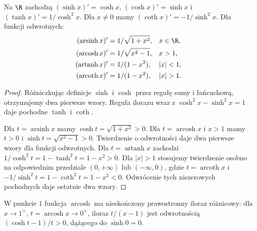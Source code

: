 \begin{twierdzenie}
\label{ma1:thm:hyperbolic-derivatives}
Na $\R$ zachodzą $(\sinh x)'=\cosh x$, $(\cosh x)'=\sinh x$ i $(\tanh x)'=1/\cosh^2x$. Dla $x\ne0$ mamy $(\coth x)'=-1/\sinh^2x$. Dla funkcji odwrotnych:
\begin{align*}
 (\operatorname{arsinh}x)'&=1/\sqrt{1+x^2},&&x\in\R,\\
 (\operatorname{arcosh}x)'&=1/\sqrt{x^2-1},&&x>1,\\
 (\operatorname{artanh}x)'&=1/(1-x^2),&&|x|<1,\\
 (\operatorname{arcoth}x)'&=1/(1-x^2),&&|x|>1.
\end{align*}
\end{twierdzenie}
\begin{proof}
Różniczkując definicje $\sinh$ i $\cosh$ przez regułę sumy i łańcuchową, otrzymujemy dwa pierwsze wzory. Reguła ilorazu wraz z $\cosh^2x-\sinh^2x=1$ daje pochodne $\tanh$ i $\coth$.

Dla $t=\operatorname{arsinh}x$ mamy $\cosh t=\sqrt{1+x^2}>0$. Dla $t=\operatorname{arcosh}x$ i $x>1$ mamy $t>0$ i $\sinh t=\sqrt{x^2-1}>0$. Twierdzenie o odwrotności daje dwa pierwsze wzory dla funkcji odwrotnych. Dla $t=\operatorname{artanh}x$ zachodzi $1/\cosh^2t=1-\tanh^2t=1-x^2>0$. Dla $|x|>1$ stosujemy twierdzenie osobno na odpowiednim przedziale $(0,+\infty)$ lub $(-\infty,0)$, gdzie $t=\operatorname{arcoth}x$ i $-1/\sinh^2t=1-\coth^2t=1-x^2<0$. Odwrócenie tych niezerowych pochodnych daje ostatnie dwa wzory.
\end{proof}
W punkcie $1$ funkcja $\operatorname{arcosh}$ ma nieskończony prawostronny iloraz różnicowy: dla $x\to1^+$, $t=\operatorname{arcosh}x\to0^+$, iloraz $t/(x-1)$ jest odwrotnością $(\cosh t-1)/t>0$, dążącego do $\sinh0=0$.

